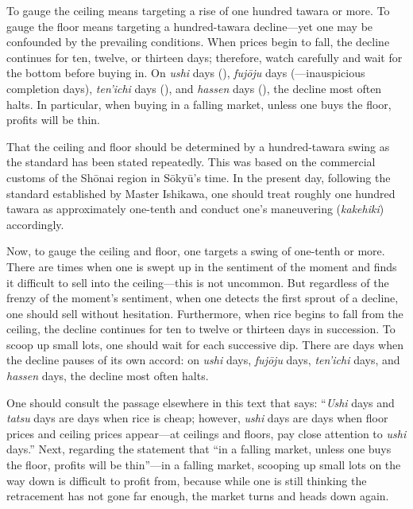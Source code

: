 
\begin{sokyubox}
{\small\itshape\color{sokyubar} }

\medskip
To gauge the ceiling means targeting a rise of one hundred tawara or
more. To gauge the floor means targeting a hundred-tawara decline---yet
one may be confounded by the prevailing conditions. When prices begin to
fall, the decline continues for ten, twelve, or thirteen days; therefore,
watch carefully and wait for the bottom before buying in. On \textit{ushi}
days (), \textit{fuj\=oju} days (---inauspicious
completion days), \textit{ten'ichi} days (), and \textit{hassen}
days (), the decline most often halts. In
particular, when buying in a falling market, unless one buys the floor,
profits will be thin.
\end{sokyubox}

\commentary
That the ceiling and floor should be determined by a hundred-tawara
swing as the standard has been stated repeatedly. This was based on the
commercial customs of the Sh\=onai region in S\=oky\=u's time. In the
present day, following the standard established by Master Ishikawa, one
should treat roughly one hundred tawara as approximately one-tenth and
conduct one's maneuvering (\textit{kakehiki}) accordingly.

Now, to gauge the ceiling and floor, one targets a swing of one-tenth or
more. There are times when one is swept up in the sentiment of the
moment and finds it difficult to sell into the ceiling---this is not
uncommon. But regardless of the frenzy of the moment's sentiment, when
one detects the first sprout of a decline, one should sell without
hesitation. Furthermore, when rice begins to fall from the ceiling, the
decline continues for ten to twelve or thirteen days in succession. To
scoop up small lots, one should wait for each successive dip. There are
days when the decline pauses of its own accord: on \textit{ushi} days,
\textit{fuj\=oju} days, \textit{ten'ichi} days, and \textit{hassen}
days, the decline most often halts.

One should consult the passage elsewhere in this text that says:
``\textit{Ushi} days and \textit{tatsu} days are days when rice is
cheap; however, \textit{ushi} days are days when floor prices and
ceiling prices appear---at ceilings and floors, pay close attention to
\textit{ushi} days.'' Next, regarding the statement that ``in a falling
market, unless one buys the floor, profits will be thin''---in a falling
market, scooping up small lots on the way down is difficult to profit
from, because while one is still thinking the retracement has not gone
far enough, the market turns and heads down again.

